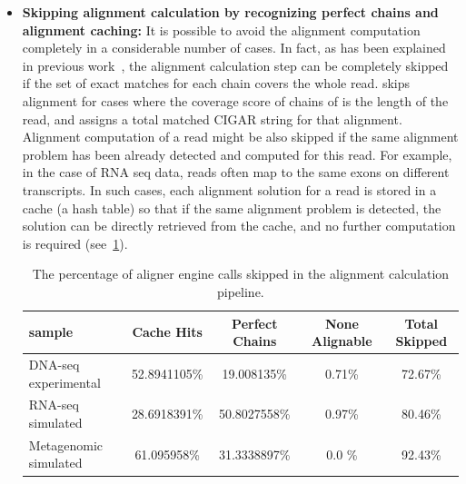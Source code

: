 \begin{itemize}
    \item \textbf{Skipping alignment calculation by recognizing perfect chains and alignment caching:} It is possible to avoid the alignment computation completely in a considerable number of cases. In fact, as has been explained in previous work~\citep{selaln}, the alignment calculation step can be completely skipped if the set of exact matches for each chain covers the whole read. \puffaligner skips alignment for cases where the coverage score of chains of \mems is the length of the read, and assigns a total matched CIGAR string for that alignment. Alignment computation of a read might be also skipped if the same alignment problem has been already detected and computed for this read. For example, in the case of RNA seq data, reads often map to the same exons on different transcripts. In such cases, each alignment solution for a read is stored in a cache (a hash table) so that if the same alignment problem is detected, the solution can be directly retrieved from the cache, and no further computation is required (see~\cref{tab:skipped-alignments}).

    \begin{table}[h!]
    \centering
    \begin{tabular}{lcccc}
        \toprule sample & Cache Hits & Perfect Chains & None Alignable & Total Skipped \\
        \midrule
        DNA-seq experimental & \num{52.8941105}\% & \num{19.008135}\% & \num{0.71}\% & \num{72.67}\% \\
        RNA-seq simulated & \num{28.6918391}\% & \num{50.8027558}\% & \num{0.97}\% & \num{80.46}\% \\
        Metagenomic simulated & \num{61.095958}\% & \num{31.3338897}\% & \num{0.0} \% & \num{92.43}\% \\
        \bottomrule
    \end{tabular}
    \caption[he percentage of skipped aligner engine calls]{The percentage of aligner engine calls skipped in the alignment calculation pipeline.}
    \label{tab:skipped-alignments}
    \end{table}


\end{itemize}
